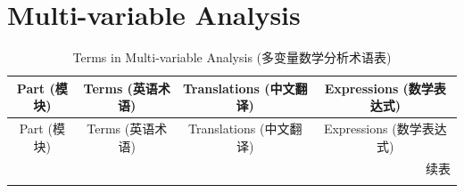 \documentclass{article}
\begin{document}
  \section{Multi-variable Analysis}
  \begin{longtable}{|c|c|c|c|}
    \caption{Terms in Multi-variable Analysis (多变量数学分析术语表)} \label{Tab.2} \\
    \hline
    Part (模块) & Terms (英语术语) & Translations (中文翻译) & Expressions (数学表达式) \\ 
    \hline
    \endfirsthead

    \hline
    Part (模块) & Terms (英语术语) & Translations (中文翻译) & Expressions (数学表达式) \\ 
    \hline
    \endhead

    \hline
    \multicolumn{4}{r}{续表} \\
    \endfoot

    \hline
    \endlastfoot


\end{longtable}
\end{document}
